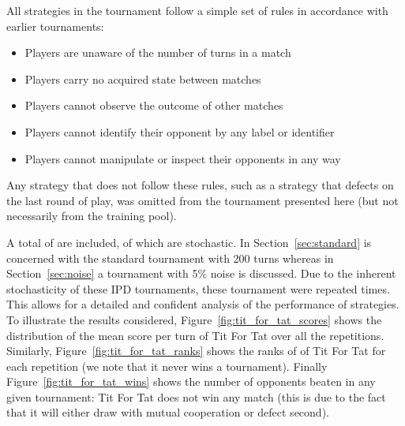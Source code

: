 \documentclass{article}
\begin{document}
All strategies in the tournament follow a simple set of
rules in accordance with earlier tournaments:

\begin{itemize}
  \item Players are unaware of the number of turns in a match
  \item Players carry no acquired state between matches
  \item Players cannot observe the outcome of other matches
  \item Players cannot identify their opponent by any label or identifier
  \item Players cannot manipulate or inspect their opponents in any way
\end{itemize}

Any strategy that does not follow these rules, such as a strategy that defects
on the last round of play, was omitted from the tournament presented here (but
not necessarily from the training pool).

A total of are included, of which
are stochastic.  In
Section~\ref{sec:standard} is concerned with the standard tournament with 200
turns whereas in Section~\ref{sec:noise} a tournament with 5\% noise is
discussed. Due to the inherent stochasticity of these IPD tournaments, these
tournament were repeated 
times. This allows for a detailed and confident analysis of the performance of
strategies. To illustrate the results considered,
Figure~\ref{fig:tit_for_tat_scores} shows the distribution of the mean score per
turn of Tit For Tat over all the repetitions. Similarly,
Figure~\ref{fig:tit_for_tat_ranks} shows the ranks of of Tit For Tat for each
repetition (we note that it never wins a tournament). Finally
Figure~\ref{fig:tit_for_tat_wins} shows the number of opponents beaten in any given
tournament: Tit For Tat does not win any match (this is due to the fact that it
will either draw with mutual cooperation or defect second).
\end{document}
